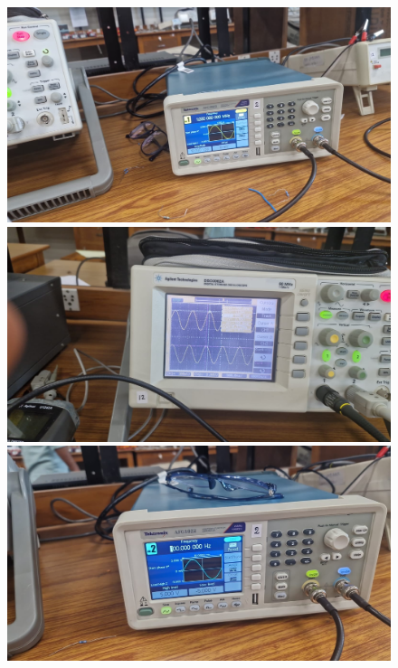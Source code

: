 \documentclass[a4paper,12pt]{article}
\begin{document}
\begin{figure}[h]
    \begin{minipage}{0.3\textwidth}
        \centering
        \includegraphics[width=\textwidth]{fig/Fig1 (4).jpg}
    \end{minipage}
    \begin{minipage}{0.3\textwidth}
        \centering
        \includegraphics[width=\textwidth]{fig/Fig1 (5).jpg}
    \end{minipage}
    \begin{minipage}{0.3\textwidth}
        \centering
        \includegraphics[width=\textwidth]{fig/Fig1 (6).jpg}
    \end{minipage}


\end{figure}
\end{document}

